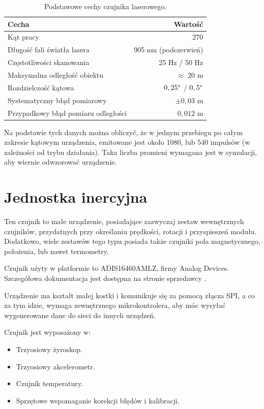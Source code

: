 		\begin{table}
		\centering
		\begin{tabular}{l r}
		Cecha & Wartość \\
		\hline
		Kąt pracy & 270\textdegree \\
		Długość fali światła lasera & 905 nm (podczerwień) \\
		Częstotliwości skanowania & 25 Hz / 50 Hz \\
		Maksymalna odległość obiektu & $\approx$ 20 m \\
		Rozdzielczość kątowa & $0,25 \degree$ / $0,5 \degree $ \\
		Systematyczny błąd pomiarowy & $\pm 0,03$ m \\
		Przypadkowy błąd pomiaru odległości & $0,012$ m \\
		\end{tabular}
		\caption{Podstawowe cechy czujnika laserowego.}
		\label{tab:lidar}
		\end{table}
		Na podstawie tych danych można obliczyć, że w jednym przebiegu po całym zakresie kątowym urządzenia, 
		emitowane jest około 1080, lub 540 impulsów (w zależności od trybu działania).
		Taka liczba promieni wymagana jest w symulacji, aby wiernie odwzorować urządzenie.

\section{Jednostka inercyjna}
	Ten czujnik to małe urządzenie, posiadające zazwyczaj zestaw wewnętrznych czujników, przydatnych przy określaniu prędkości, rotacji i przyspieszeń modułu.
	Dodatkowo, wiele zestawów tego typu posiada także czujniki pola magnetycznego, położenia, lub nawet termometry.
	
	Czujnik użyty w platformie to ADIS16460AMLZ, firmy Analog Devices. Szczegółowa dokumentacja jest dostępna na stronie sprzedawcy \cite{adis_website}.
	
	Urządzenie ma kształt małej kostki i komunikuje się za pomocą złącza SPI, a co za tym idzie, wymaga zewnętrznego mikrokontrolera, aby móc wysyłać wygenerowane dane
	do sieci do innych urządzeń.
	
	Czujnik jest wyposażony w:
	\begin{itemize}
		\item Trzyosiowy żyroskop.
		\item Trzyosiowy akcelerometr.
		\item Czujnik temperatury.
		\item Sprzętowe wspomaganie korekcji błędów i kalibracji.
	\end{itemize}
	
